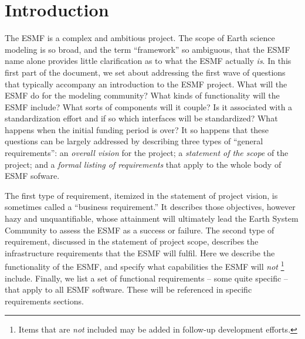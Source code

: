 \section{Introduction}
The ESMF is a complex and ambitious 
project.   The scope of Earth science modeling is so broad, and the 
term ``framework'' so ambiguous, that the ESMF name alone provides 
little clarification as to what the ESMF actually {\it is}.  In 
this first part of the document, we set about addressing the first wave 
of questions that typically accompany an introduction to the ESMF project.  
What will the 
ESMF do for the modeling community?  What kinds of functionality will the ESMF 
include?  What sorts of components will it couple?  Is it associated with 
a standardization effort and if so which interfaces will be 
standardized?  What happens when the initial funding period is over?  
It so happens that these questions can be largely addressed by
describing three types of ``general requirements'': an {\it overall vision}
for the project; a {\it statement of the scope} of the project; and a {\it formal listing of requirements} that apply to the whole body of ESMF sofware.

The first type of requirement, itemized in the statement of project
vision, is sometimes called a ``business requirement.'' \cite{wiegers}
It describes those objectives, however hazy and unquantifiable, whose
attainment will ultimately lead the Earth System Community to assess
the ESMF as a success or failure.  The second type of requirement,
discussed in the statement of project scope, describes the
infrastructure requirements that the ESMF will fulfil.  Here we
describe the functionality of the ESMF, and specify what capabilities
the ESMF will {\it not} 
\footnote{ Items that are {\it not}
included may be added in follow-up development efforts.}
include.
Finally, we list a set of functional
requirements -- some quite specific -- that apply to all ESMF
software.  These will be referenced in specific requirements 
sections. 





